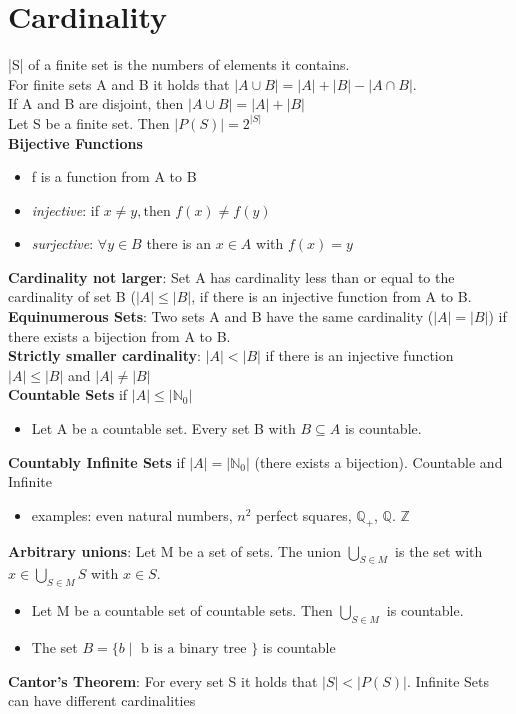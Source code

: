 \section*{Cardinality}
|S| of a finite set is the numbers of elements it contains. \\
For finite sets A and B it holds that $|A \cup B| = |A| + |B| - |A \cap B|$. \\
If A and B are disjoint, then $|A \cup B| = |A| + |B|$ \\
Let S be a finite set. Then $|P(S)| = 2^{|S|}$ \\
\textbf{Bijective Functions} 
\begin{itemize}[noitemsep,topsep=0pt,leftmargin=*]
    \item f is a function from A to B 
    \item \textit{injective}: if $x \neq y, \text{then }f(x) \neq f(y)$ %
    \item \textit{surjective}: $\forall y \in B$ there is an $x \in A$ with $f(x) = y$ 
\end{itemize}
\textbf{Cardinality not larger}: Set A has cardinality less than or equal to the cardinality of set B ($|A| \leq |B|$, if there is an injective function from A to B. \\
\textbf{Equinumerous Sets}: Two sets A and B have the same cardinality ($|A| = |B|$) if there exists a bijection from A to B. \\
\textbf{Strictly smaller cardinality}: $|A| < |B|$ if there is an injective function $|A| \leq |B|$ and  $|A| \neq |B|$ \\
\textbf{Countable Sets} if $|A| \leq |\mathbb{N}_0|$ 
\begin{itemize}[noitemsep,topsep=0pt,leftmargin=*]
    \item Let A be a countable set. Every set B with $B \subseteq A$ is countable.
\end{itemize}
\textbf{Countably Infinite Sets} if $|A| = |\mathbb{N}_0|$ (there exists a bijection). Countable and Infinite 
\begin{itemize}[noitemsep,topsep=0pt,leftmargin=*]
    \item examples: even natural numbers, $n^2$ perfect squares, $\mathbb{Q}_+$, $\mathbb{Q}$. $\mathbb{Z}$ 
\end{itemize}
\textbf{Arbitrary unions}: Let M be a set of sets. The union $\bigcup_{S \in M}$ is the set with $x \in \bigcup_{S \in M} S$ with $x \in S$.
\begin{itemize}[noitemsep,topsep=0pt,leftmargin=*]
    \item Let M be a countable set of countable sets. Then $\bigcup_{S \in M}$ is countable.
    \item The set $B = \{ b \mid \text{ b is a binary tree }\}$ is countable
\end{itemize}
\textbf{Cantor's Theorem}: For every set S it holds that $|S| < |P(S)|$. Infinite Sets can have different cardinalities



